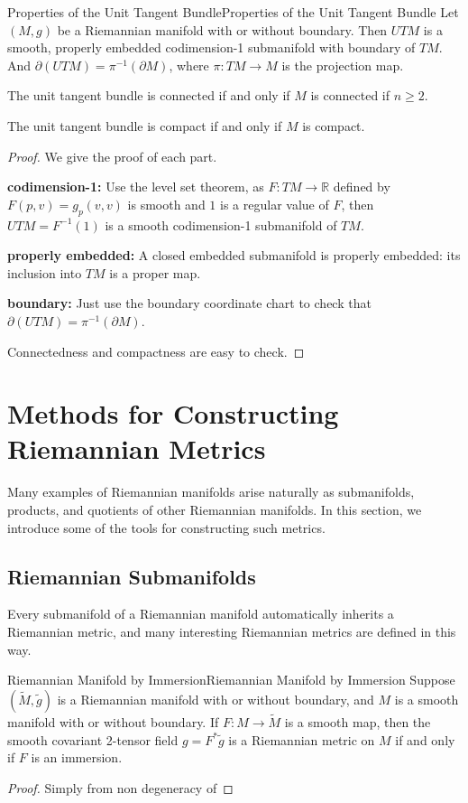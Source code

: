 \documentclass[../main.tex]{subfiles}
\begin{document}
\begin{proposition}{Properties of the Unit Tangent Bundle}{Properties of the Unit Tangent Bundle}
	Let $(M, g)$ be a Riemannian manifold with or without boundary. Then $UTM$ is a smooth, properly embedded codimension-1 submanifold with boundary of $TM$. And $\partial(UTM) = \pi^{-1}(\partial M)$, where $\pi: TM \to M$ is the projection map.

	The unit tangent bundle is connected if and only if $M$ is connected if $n \geq 2$.

	The unit tangent bundle is compact if and only if $M$ is compact.
\end{proposition}
\begin{proof}
	We give the proof of each part.

	\textbf{codimension-1:} Use the level set theorem, as $F: TM \to \mathbb{R}$ defined by $F(p, v) = g_p(v, v)$ is smooth and $1$ is a regular value of $F$, then $UTM = F^{-1}(1)$ is a smooth codimension-1 submanifold of $TM$.

	\textbf{properly embedded:} A closed embedded submanifold is properly embedded: its inclusion into $TM$ is a proper map.

	\textbf{boundary:} Just use the boundary coordinate chart to check that $\partial(UTM) = \pi^{-1}(\partial M)$.

	Connectedness and compactness are easy to check.
\end{proof}

\section{Methods for Constructing Riemannian Metrics}
Many examples of Riemannian manifolds arise naturally as submanifolds, products, and quotients of other Riemannian manifolds. In this section, we introduce some of the tools for constructing such metrics.

\subsection{Riemannian Submanifolds}
Every submanifold of a Riemannian manifold automatically inherits a Riemannian metric, and many interesting Riemannian metrics are defined in this way.

\begin{lemma}{Riemannian Manifold by Immersion}{Riemannian Manifold by Immersion}
	Suppose $(\tilde{M}, \tilde{g})$ is a Riemannian manifold with or without boundary, and $M$ is a smooth manifold with or without boundary. If $F: M \to \tilde{M}$ is a smooth map, then the smooth covariant 2-tensor field $g = F^*\tilde{g}$ is a Riemannian metric on $M$ if and only if $F$ is an immersion.
\end{lemma}
\begin{proof}
	Simply from non degeneracy of
\end{proof}
\end{document}
